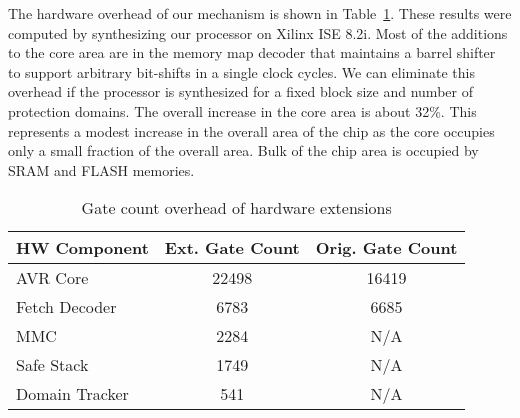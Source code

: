 The hardware overhead of our mechanism is shown in Table~\ref{tab:hwsize}.
%
These results were computed by synthesizing our processor on Xilinx ISE 8.2i.
%
Most of the additions to the core area are in the memory map decoder that maintains a barrel shifter to support arbitrary bit-shifts in a single clock cycles.
%
We can eliminate this overhead if the processor is synthesized for a fixed block size and number of protection domains.
%
The overall increase in the core area is about 32\%.
%
This represents a modest increase in the overall area of the chip as the core occupies only a small fraction of the overall area.
%
Bulk of the chip area is occupied by SRAM and FLASH memories.
%
\begin{table}[htdp]
\centering
\small{
\begin{tabular}{|l|c|c|}
	\hline
	HW Component & Ext. Gate Count & Orig. Gate Count\\
	\hline
	AVR Core & 22498 & 16419\\
	Fetch Decoder & 6783 & 6685\\
	MMC & 2284 & N/A \\
	Safe Stack & 1749 & N/A \\
	Domain Tracker & 541 & N/A \\
	\hline
\end{tabular}}
\caption{Gate count overhead of hardware extensions}
\label{tab:hwsize}
\end{table}
%






